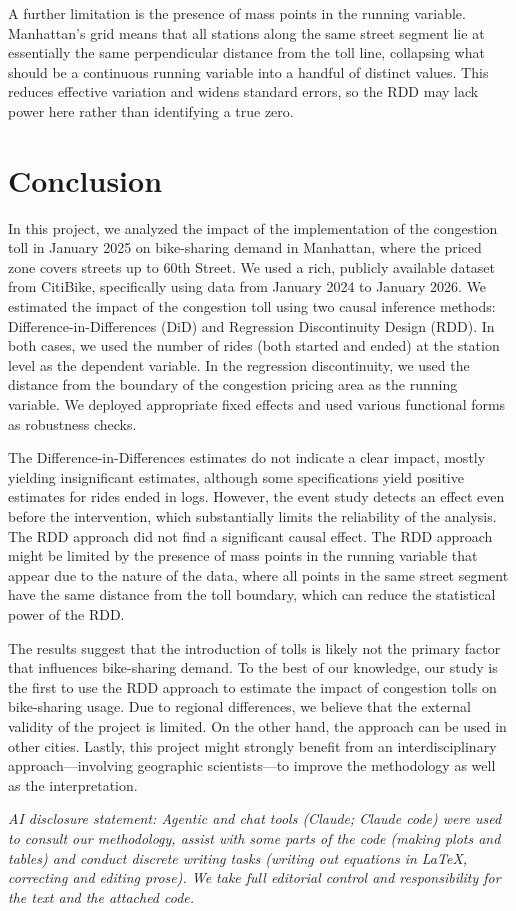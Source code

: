 \documentclass[10pt]{article}
\begin{document}
A further limitation is the presence of mass points in the running variable. Manhattan's grid means that all stations along the same street segment lie at essentially the same perpendicular distance from the toll line, collapsing what should be a continuous running variable into a handful of distinct values. This reduces effective variation and widens standard errors, so the RDD may lack power here rather than identifying a true zero.

\section{Conclusion}

In this project, we analyzed the impact of the implementation of the congestion toll in January 2025 on bike-sharing demand in Manhattan, where the priced zone covers streets up to 60th Street. We used a rich, publicly available dataset from CitiBike, specifically using data from January 2024 to January 2026. We estimated the impact of the congestion toll using two causal inference methods: Difference-in-Differences (DiD) and Regression Discontinuity Design (RDD). In both cases, we used the number of rides (both started and ended) at the station level as the dependent variable. In the regression discontinuity, we used the distance from the boundary of the congestion pricing area as the running variable. We deployed appropriate fixed effects and used various functional forms as robustness checks.

The Difference-in-Differences estimates do not indicate a clear impact, mostly yielding insignificant estimates, although some specifications yield positive estimates for rides ended in logs. However, the event study detects an effect even before the intervention, which substantially limits the reliability of the analysis. The RDD approach did not find a significant causal effect. The RDD approach might be limited by the presence of mass points in the running variable that appear due to the nature of the data, where all points in the same street segment have the same distance from the toll boundary, which can reduce the statistical power of the RDD.

The results suggest that the introduction of tolls is likely not the primary factor that influences bike-sharing demand. To the best of our knowledge, our study is the first to use the RDD approach to estimate the impact of congestion tolls on bike-sharing usage. Due to regional differences, we believe that the external validity of the project is limited. On the other hand, the approach can be used in other cities. Lastly, this project might strongly benefit from an interdisciplinary approach—involving geographic scientists—to improve the methodology as well as the interpretation.

\emph{AI disclosure statement: Agentic and chat tools (Claude; Claude code) were used to consult our methodology, assist with some parts of the code (making plots and tables) and conduct discrete writing tasks (writing out equations in \LaTeX, correcting and editing prose). We take full editorial control and responsibility for the text and the attached code.}

\printbibliography
\end{document}
